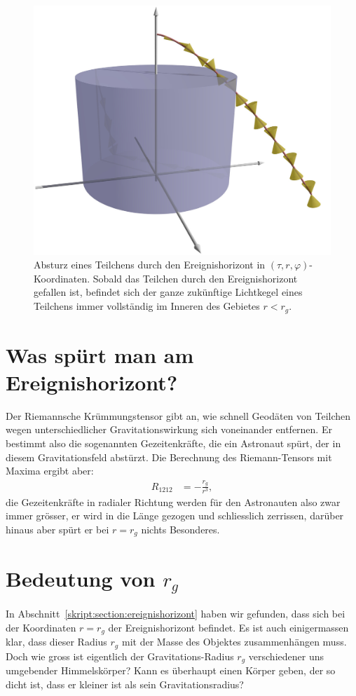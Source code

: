 \begin{figure}
\centering
\includegraphics[width=\hsize]{chapters/3d/blackhole.jpg}
\caption{Absturz eines Teilchens durch den Ereignishorizont in
$(\tau,r,\varphi)$-Koordinaten.
Sobald das Teilchen durch den Ereignishorizont gefallen ist,
befindet sich der ganze zukünftige Lichtkegel eines Teilchens 
immer vollständig im Inneren des Gebietes $r<r_g$.
\label{skript:kruemmung:fig:blackhole}}
\end{figure}


\section{Was spürt man am Ereignishorizont?%
\label{skript:section:wasspuertman}}
Der Riemannsche Krümmungstensor gibt an, wie schnell Geodäten von Teilchen
wegen unterschiedlicher Gravitationswirkung sich voneinander entfernen.
Er bestimmt also die sogenannten Gezeitenkräfte, die ein Astronaut spürt,
der in diesem Gravitationsfeld abstürzt.
%
Die Berechnung des Riemann-Tensors mit Maxima ergibt aber:
\begin{align*}
R_{1212}&=-\frac{r_g}{r^3},
\end{align*}
die Gezeitenkräfte in radialer Richtung werden für den Astronauten
also zwar immer grösser, er wird in die Länge gezogen und schliesslich 
zerrissen, darüber hinaus aber spürt er bei $r=r_g$ nichts Besonderes.

\section{Bedeutung von $r_g$%
\label{skript:schwarzschild:rg}}
In Abschnitt~\ref{skript:section:ereignishorizont} haben wir gefunden,
dass sich bei der Koordinaten $r=r_g$ der Ereignishorizont befindet.
Es ist auch einigermassen klar, dass dieser Radius $r_g$ mit der
Masse des Objektes zusammenhängen muss.
Doch wie gross ist eigentlich der Gravitations-Radius $r_g$ verschiedener
uns umgebender Himmelskörper? Kann es überhaupt einen Körper geben, der
so dicht ist, dass er kleiner ist als sein Gravitationsradius?

